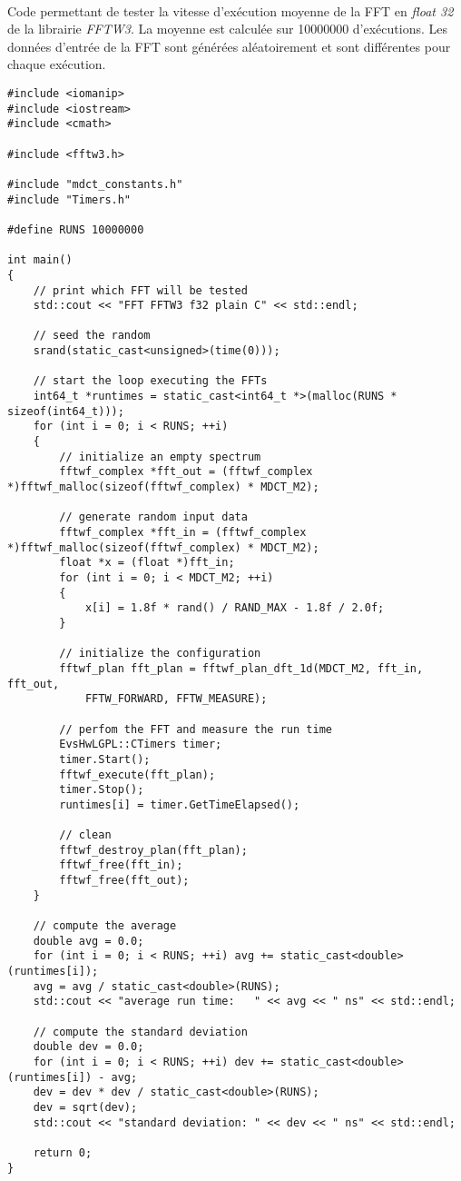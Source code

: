 \documentclass{article}
\begin{document}
\paragraph{}
Code permettant de tester la vitesse d'exécution moyenne de la FFT en \emph{float 32} de la librairie \emph{FFTW3}. La moyenne est calculée sur \SI{10000000}{} d'exécutions. Les données d'entrée de la FFT sont générées aléatoirement et sont différentes pour chaque exécution.
\lstset{language=C++}
\begin{lstlisting}
#include <iomanip>
#include <iostream>
#include <cmath>

#include <fftw3.h>

#include "mdct_constants.h"
#include "Timers.h"

#define RUNS 10000000

int main()
{
    // print which FFT will be tested
    std::cout << "FFT FFTW3 f32 plain C" << std::endl;

    // seed the random
    srand(static_cast<unsigned>(time(0)));

    // start the loop executing the FFTs
    int64_t *runtimes = static_cast<int64_t *>(malloc(RUNS * sizeof(int64_t)));
    for (int i = 0; i < RUNS; ++i)
    {
        // initialize an empty spectrum
        fftwf_complex *fft_out = (fftwf_complex *)fftwf_malloc(sizeof(fftwf_complex) * MDCT_M2);

        // generate random input data
        fftwf_complex *fft_in = (fftwf_complex *)fftwf_malloc(sizeof(fftwf_complex) * MDCT_M2);
        float *x = (float *)fft_in;
        for (int i = 0; i < MDCT_M2; ++i)
        {
            x[i] = 1.8f * rand() / RAND_MAX - 1.8f / 2.0f;
        }

        // initialize the configuration
        fftwf_plan fft_plan = fftwf_plan_dft_1d(MDCT_M2, fft_in, fft_out,
            FFTW_FORWARD, FFTW_MEASURE);

        // perfom the FFT and measure the run time
        EvsHwLGPL::CTimers timer;
        timer.Start();
        fftwf_execute(fft_plan);
        timer.Stop();
        runtimes[i] = timer.GetTimeElapsed();

        // clean
        fftwf_destroy_plan(fft_plan);
        fftwf_free(fft_in);
        fftwf_free(fft_out);
    }

    // compute the average
    double avg = 0.0;
    for (int i = 0; i < RUNS; ++i) avg += static_cast<double>(runtimes[i]);
    avg = avg / static_cast<double>(RUNS);
    std::cout << "average run time:   " << avg << " ns" << std::endl;

    // compute the standard deviation
    double dev = 0.0;
    for (int i = 0; i < RUNS; ++i) dev += static_cast<double>(runtimes[i]) - avg;
    dev = dev * dev / static_cast<double>(RUNS);
    dev = sqrt(dev);
    std::cout << "standard deviation: " << dev << " ns" << std::endl;

    return 0;
}
\end{lstlisting}
\end{document}
